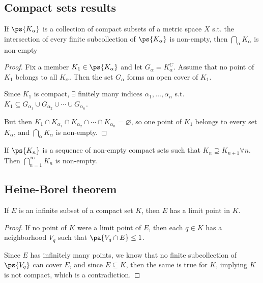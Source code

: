\documentclass[11pt]{scrartcl}
\numberwithin{equation}{section}
\begin{document}
\subsection{Compact sets results}
\begin{theorem}
    If $\ps{K_\alpha}$ is a collection of compact subsets of a metric 
    space $X$ s.t. the intersection of every finite subcollection 
    of $\ps{K_\alpha}$ is non-empty, then $\bigcap_\alpha K_\alpha$ is 
    non-empty
\end{theorem}
\begin{proof}
    Fix a member $K_1\in\ps{K_\alpha}$ and let $G_\alpha=K_\alpha^C$.
    Assume that no point of $K_1$ belongs to all $K_\alpha$. Then the 
    set $G_\alpha$ forms an open cover of $K_1$.

    Since $K_1$ is compact, $\exists$ finitely many indices $\alpha_1,\dots,\alpha_n$ s.t. $K_1\subseteq G_{\alpha_1}\cup G_{\alpha_2}\cup \cdots\cup G_{\alpha_n}$.

    But then $K_1\cap K_{\alpha_1}\cap K_{\alpha_2}\cap \cdots\cap K_{\alpha_n}=\varnothing$, so one point of $K_1$ belongs to every set 
    $K_\alpha$, and $\bigcap_\alpha K_\alpha$ is non-empty.
\end{proof}
\begin{corollary}
    \label{co:nonemptyintersection}
    If $\ps{K_n}$ is a sequence of non-empty compact sets such that 
    $K_n\supseteq K_{n+1}\forall n$. Then $\bigcap_{n=1}^{\infty}K_n$ is 
    non-empty.
\end{corollary}

\subsection{Heine-Borel theorem}

\begin{lemma}
    If $E$ is an infinite subset of a compact set $K$, then $E$ has a 
    limit point in $K$.
\end{lemma}

\begin{proof}
    If no point of $K$ were a limit point of $E$, then each $q\in K$
    has a neighborhood $V_q$ such that $\pa{V_q\cap E} \leq 1$.

    Since $E$ has infinitely many points, we know that no finite subcollection of 
    $\ps{V_q}$ can cover $E$,
    and since $E\subseteq K$, then the same is true for $K$,
    implying $K$ is not compact, which is a contradiction.
\end{proof}
\end{document}

